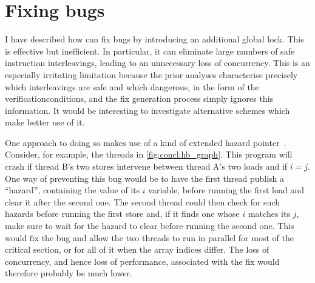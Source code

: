 \section{Fixing bugs}

I have described how {\technique} can fix bugs by introducing an
additional global lock.  This is effective but inefficient.  In
particular, it can eliminate large numbers of safe instruction
interleavings, leading to an unnecessary loss of concurrency.  This is
an especially irritating limitation because the prior analyses
characterise precisely which interleavings are safe and which
dangerous, in the form of the \glspl{verificationcondition}, and the
fix generation process simply ignores this information.  It would be
interesting to investigate alternative schemes which make better use
of it.


One approach to doing so makes use of a kind of extended hazard
pointer~\cite{Michael2004}.  Consider, for example, the threads in
\autoref{fig:concl:hb_graph}.  This program will crash if thread B's
two stores intervene between thread A's two loads and if $i = j$.  One
way of preventing this bug would be to have the first thread publish a
``hazard'', containing the value of its $i$ variable, before running
the first load and clear it after the second one.  The second thread
could then check for such hazards before running the first store and,
if it finds one whose $i$ matches its $j$, make sure to wait for the
hazard to clear before running the second one.  This would fix the bug
and allow the two threads to run in parallel for most of the critical
section, or for all of it when the array indices differ.  The loss of
concurrency, and hence loss of performance, associated with the fix
would therefore probably be much lower.

